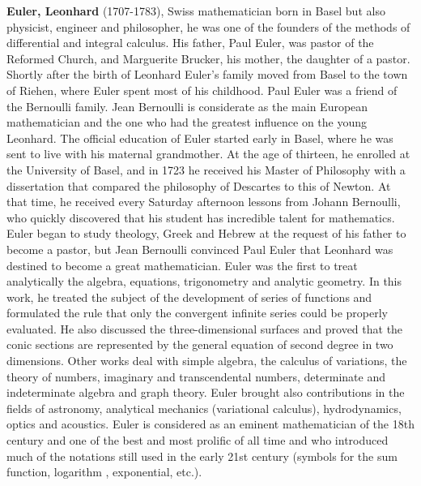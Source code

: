 \textbf{Euler, Leonhard} (1707-1783), Swiss mathematician born in Basel but also physicist, engineer and philosopher, he was one of the founders of the methods of differential and integral calculus.  His father, Paul Euler, was pastor of the Reformed Church, and Marguerite Brucker, his mother, the daughter of a pastor. Shortly after the birth of Leonhard Euler's family moved from Basel to the town of Riehen, where Euler spent most of his childhood. Paul Euler was a friend of the Bernoulli family. Jean Bernoulli is considerate as the main European mathematician and the one who had the greatest influence on the young Leonhard. The official education of Euler started early in Basel, where he was sent to live with his maternal grandmother. At the age of thirteen, he enrolled at the University of Basel, and in 1723 he received his Master of Philosophy with a dissertation that compared the philosophy of Descartes to this of Newton. At that time, he received every Saturday afternoon lessons from Johann Bernoulli, who quickly discovered that his student has incredible talent for mathematics. Euler began to study theology, Greek and Hebrew at the request of his father to become a pastor, but Jean Bernoulli convinced Paul Euler that Leonhard was destined to become a great mathematician. Euler was the first to treat analytically the algebra, equations, trigonometry and analytic geometry. In this work, he treated the subject of the development of series of functions and formulated the rule that only the convergent infinite series could be properly evaluated. He also discussed the three-dimensional surfaces and proved that the conic sections are represented by the general equation of second degree in two dimensions. Other works deal with simple algebra, the calculus of variations, the theory of numbers, imaginary and transcendental numbers, determinate and indeterminate algebra and graph theory. Euler brought also contributions in the fields of astronomy, analytical mechanics (variational calculus), hydrodynamics, optics and acoustics. Euler is considered as an eminent mathematician of the 18th century and one of the best and most prolific of all time and who introduced much of the notations still used in the early 21st century (symbols for the sum function, logarithm , exponential, etc.).

{}

